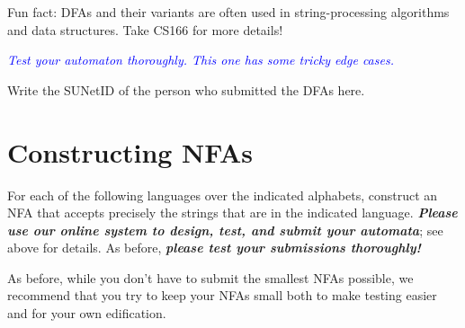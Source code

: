 \documentclass{article}
\renewcommand{\(}{\left(}
\renewcommand{\)}{\right)}
\theoremstyle{plain}
\theoremstyle{plain}
\theoremstyle{definition}
\renewcommand{\emph}[1]{\textit{\textbf{#1}}}
\newcommand{\annotate}[1]{\textit{\textcolor{blue}{#1}}}
\begin{document}
\begin{enumerate}[label*=\roman*.,ref=\roman*]
    Fun fact: DFAs and their variants are often used in string-processing algorithms and data structures. Take CS166 for more details!

    \annotate{Test your automaton thoroughly. This one has some tricky edge cases.}

\end{enumerate}

\begin{shaded}
Write the SUNetID of the person who submitted the DFAs here. 
\end{shaded}

\pagebreak

\section{Constructing NFAs}

For each of the following languages over the indicated alphabets, construct an NFA that accepts precisely the strings that are in the indicated language. \emph{Please use our online system to design, test, and submit your automata}; see above for details. As before, \emph{please test your submissions thoroughly!}

As before, while you don't have to submit the smallest NFAs possible, we recommend that you try to keep your NFAs small both to make testing easier and for your own edification.
\end{document}
